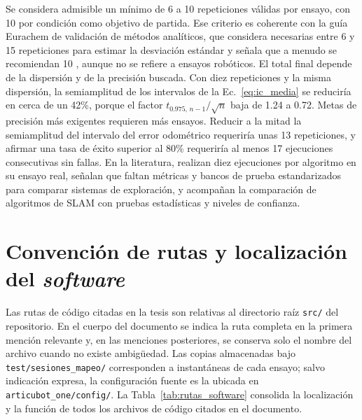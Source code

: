 \begin{appendices}
Se considera admisible un mínimo de 6 a 10 repeticiones válidas por ensayo, con
10 por condición como objetivo de partida. Ese criterio es coherente con la guía
Eurachem de validación de métodos analíticos, que considera necesarias entre
6 y 15 repeticiones para estimar la desviación estándar y señala que a menudo
se recomiendan 10 \citep[Sec.~5.3.2]{cantwell2025eurachem}, aunque no se
refiere a ensayos robóticos. El total final depende de la dispersión y de la
precisión buscada. Con diez
repeticiones y la misma dispersión, la semiamplitud de los intervalos de la
Ec.~\eqref{eq:ic_media} se reduciría en cerca de un 42\%, porque el factor
$t_{0.975,\,n-1}/\sqrt{n}$ baja de 1.24 a 0.72. Metas de precisión más
exigentes requieren más ensayos. Reducir a la mitad la
semiamplitud del intervalo del error odométrico requeriría unas 13
repeticiones, y afirmar una tasa de éxito superior al 80\% requeriría al menos
17 ejecuciones consecutivas sin fallas. En la literatura,
\citet{liu2025frontier} realizan diez ejecuciones por algoritmo en su ensayo
real, \citet{placed2023active} señalan que faltan métricas y bancos de prueba
estandarizados para comparar sistemas de exploración, y \citet{trejos2022slam}
acompañan la comparación de algoritmos de SLAM con pruebas estadísticas y
niveles de confianza.

\section{Convención de rutas y localización del \texorpdfstring{\textit{software}}{software}}
\label{anx:rutas_software}

Las rutas de código citadas en la tesis son relativas al directorio raíz
\texttt{src/} del repositorio. En el cuerpo del documento se indica la ruta
completa en la primera mención relevante y, en las menciones posteriores, se
conserva solo el nombre del archivo cuando no existe ambigüedad. Las copias
almacenadas bajo \texttt{test/\allowbreak{}sesiones\_\allowbreak{}mapeo/} corresponden a instantáneas de
cada ensayo; salvo indicación expresa, la configuración fuente es la ubicada
en \texttt{articubot\_\allowbreak{}one/\allowbreak{}config/}. La Tabla~\ref{tab:rutas_software} consolida la localización y la función de
todos los archivos de código citados en el documento.


\end{appendices}

